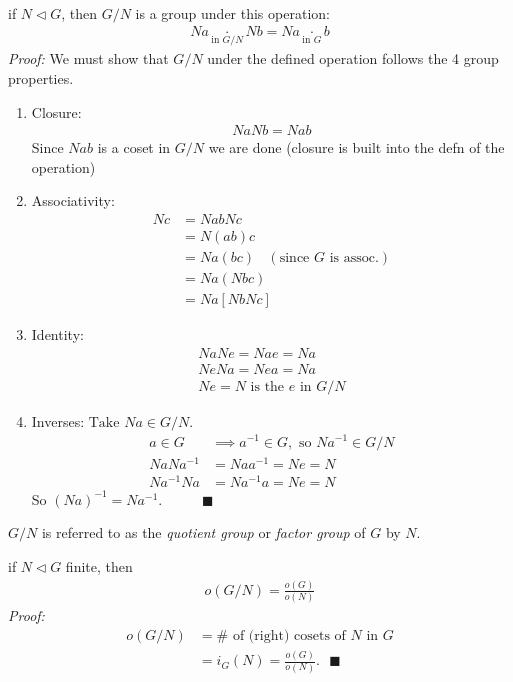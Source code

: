 \begin{theorem} \hspace{0.01in}\\
if $N\triangleleft G$, then $G/N$ is a group under this operation:
\begin{align}
    Na \underset{\text{in }G/N}{\cdot} Nb = Na \underset{\text{in }G}{\cdot} b \nonumber
\end{align}
\textit{Proof:} We must show that $G/N$ under the defined operation follows the 4 group properties.
\begin{enumerate}[label=\roman*)]
    \item Closure:
    \begin{align}
        NaNb=Nab \nonumber
    \end{align}
    Since $Nab$ is a coset in $G/N$ we are done (closure is built into the defn of the operation)
    \item Associativity:
    \begin{align}
        [NaNb]Nc&=NabNc \nonumber\\
        &= N(ab)c \nonumber \\
        &= Na(bc)  \ \ \ \ (\text{since } G \text{ is assoc.})\nonumber \\
        &= Na(Nbc) \nonumber \\
        &= Na[NbNc] \nonumber
    \end{align}
    \item Identity:
    \begin{align}
        NaNe=Nae=Na\nonumber \\
        NeNa=Nea=Na\nonumber \\
        Ne=N \text{ is the } e \text{ in } G/N \nonumber
    \end{align}
    \item Inverses: $\text{Take }Na\in G/N.$
    \begin{align}
        a\in G &\implies a^{-1} \in G, \text{ so } Na^{-1}\in G/N \nonumber \\
        NaNa^{-1}&=Naa^{-1}=Ne=N \nonumber \\
        Na^{-1}Na&=Na^{-1}a=Ne=N \nonumber
    \end{align}
    So $(Na)^{-1}=Na^{-1}$. \ \ \ \ \ $\blacksquare$
\end{enumerate}

$G/N$ is referred to as the \textit{quotient group} or \textit{factor group} of $G$ by $N$.
\end{theorem}
\begin{lemma}
if $N\triangleleft G$ finite, then
\begin{align}
    o(G/N)=\frac{o(G)}{o(N)}\nonumber
\end{align}
\textit{Proof:}
\begin{align}
    o(G/N)&= \# \text{ of (right) cosets of }N \text{ in }G \nonumber \\
    &= i_G(N)=\frac{o(G)}{o(N)}. \ \ \ \blacksquare \nonumber
\end{align}
\end{lemma}

